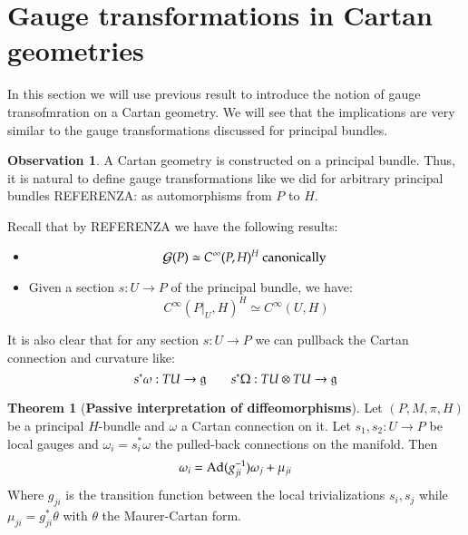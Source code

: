 \documentclass[12pt,a4paper]{report}
\theoremstyle{definition}
\theoremstyle{Theorem}
\newtheorem{Theo}[Def]{Theorem}
\theoremstyle{break}
\theoremstyle{definition}
\newtheorem{Obs}[Def]{Observation}
\begin{document}
	\section{Gauge transformations in Cartan geometries}
	In this section we will use previous result to introduce the notion of gauge transofmration on a Cartan geometry. We will see that the implications are very similar to the gauge transformations discussed for principal bundles.
	\begin{Obs}
		A Cartan geometry is constructed on a principal bundle. Thus, it is natural to define gauge transformations like we did for arbitrary principal bundles REFERENZA: as automorphisms from $P$ to $H$.
	\end{Obs}
	Recall that by REFERENZA we have the following results:
	\begin{itemize}
		\item $$\mathcal{G}(P)\simeq C^\infty(P,H)^H \hbox{ canonically }$$
		\item Given a section $s:U\rightarrow P$ of the principal bundle, we have:
		$$C^\infty(P|_U,H)^H\simeq C^\infty(U,H)$$
	\end{itemize}
	It is also clear that for any section $s:U\rightarrow P$ we can pullback the Cartan connection and curvature like:
	$$s^*\omega:TU\rightarrow \mathfrak{g}\hspace{20 pt} s^*\Omega:TU\otimes TU\rightarrow \mathfrak{g}$$
		\begin{Theo}[\textbf{Passive interpretation of diffeomorphisms}]
		Let $(P,M,\pi,H)$ be a principal $H$-bundle and $\omega$ a Cartan connection on it. Let $s_1,s_2:U\rightarrow P$ be local gauges and $\omega_{i}=s_i^*\omega$ the pulled-back connections on the manifold. Then 
		$$\omega_i=\hbox{Ad}(g_{ji}^{-1})\omega_j+\mu_{ji}$$
		Where $g_{ji}$ is the transition function between the local trivializations $s_i,s_j$ while $\mu_{ji}=g_{ji}^*\theta$ with $\theta$ the Maurer-Cartan form.
	\end{Theo}
\end{document}
